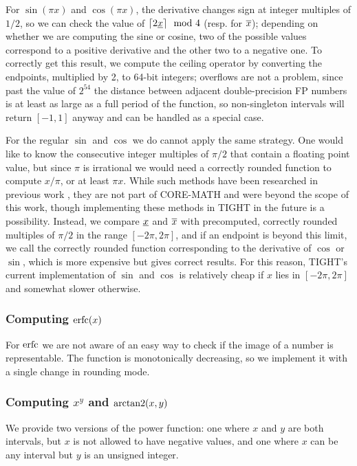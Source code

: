 For $\sin(\pi x)$ and $\cos(\pi x)$, the derivative changes sign at integer multiples of $1/2$, so we can check the value of $\lceil2\underline{x}\rceil\mod 4$ (resp. for $\overline{x}$); depending on whether we are computing the sine or cosine, two of the possible values correspond to a positive derivative and the other two to a negative one.
To correctly get this result, we compute the ceiling operator by converting the endpoints, multiplied by 2, to 64-bit integers; overflows are not a problem, since past the value of $2^{54}$ the distance between adjacent double-precision FP numbers is at least as large as a full period of the function, so non-singleton intervals will return $[-1,1]$ anyway and can be handled as a special case.

For the regular $\sin$ and $\cos$ we do cannot apply the same strategy. One would like to know the consecutive integer multiples of $\pi/2$ that contain a floating point value, but since $\pi$ is irrational we would need a correctly rounded function to compute $x/\pi$, or at least $\pi x$. While such methods have been researched in previous work \cite{crpi}, they are not part of CORE-MATH and were beyond the scope of this work, though implementing these methods in TIGHT in the future is a possibility.
Instead, we compare $\underline{x}$ and $\overline{x}$ with precomputed, correctly rounded multiples of $\pi/2$ in the range $[-2\pi, 2\pi]$, and if an endpoint is beyond this limit, we call the correctly rounded function corresponding to the derivative of $\cos$ or $\sin$, which is more expensive but gives correct results.
For this reason, TIGHT's current implementation of $\sin$ and $\cos$ is relatively cheap if $x$ lies in $[-2\pi, 2\pi]$ and somewhat slower otherwise.

\subsubsection{Computing $\operatorname{erfc}(x)$}
For $\operatorname{erfc}$ we are not aware of an easy way to check if the image of a number is representable. The function is monotonically decreasing, so we implement it with a single change in rounding mode.

\subsubsection{Computing $x^y$ and $\operatorname{arctan2}(x,y)$}
We provide two versions of the power function: one where $x$ and $y$ are both intervals, but $x$ is not allowed to have negative values, and one where $x$ can be any interval but $y$ is an unsigned integer.

